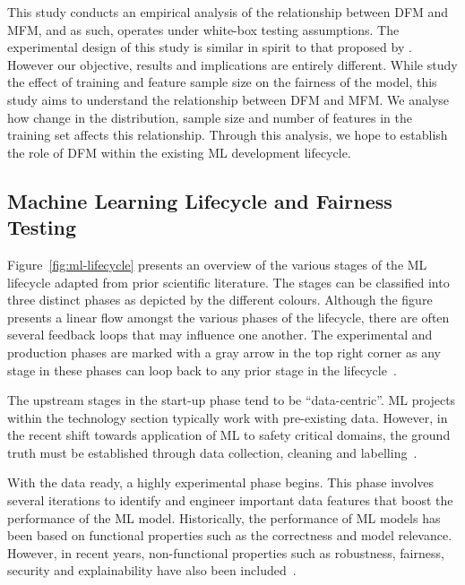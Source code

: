 \documentclass[conference,review,anonymous]{IEEEtran}
\begin{document}
This study conducts an empirical analysis of the relationship between
DFM and MFM, and as such, operates under white-box testing
assumptions. The experimental design of this study is similar in
spirit to that proposed by \cite{zhang2021ignorance}. However
our objective, results and implications are entirely different. While
\cite{zhang2021ignorance} study the effect of training and
feature sample size on the fairness of the model, this study aims to
understand the relationship between DFM and MFM. We analyse how change
in the distribution, sample size and number of features in the
training set affects this relationship. Through this analysis, we hope
to establish the role of DFM within the existing ML development
lifecycle.

\subsection{Machine Learning Lifecycle and Fairness
  Testing}\label{sec:ml-lifecycle}

Figure \ref{fig:ml-lifecycle} presents an overview of the various
stages of the ML lifecycle adapted from prior scientific literature.
The stages can be classified into three distinct phases as depicted by
the different colours. Although the figure presents a linear flow
amongst the various phases of the lifecycle, there are often several
feedback loops that may influence one another. The experimental and
production phases are marked with a gray arrow in the top right corner
as any stage in these phases can loop back to any prior stage in the
lifecycle \cite{amershi2019software,haakman2020ai,breck2019data}.

The upstream stages in the start-up phase tend to be ``data-centric''.
ML projects within the technology section typically work with
pre-existing data. However, in the recent shift towards application of
ML to safety critical domains, the ground truth must be established
through data collection, cleaning and
labelling \cite{sambasivan2021everyone,bosch2021engineering,amershi2019software}.

With the data ready, a highly experimental phase begins. This phase
involves several iterations to identify and engineer important data
features that boost the performance of the ML model. Historically, the
performance of ML models has been based on functional properties such
as the correctness and model relevance. However, in recent years,
non-functional properties such as robustness, fairness, security and
explainability have also been included \cite{zhang2020machine}.
\end{document}

